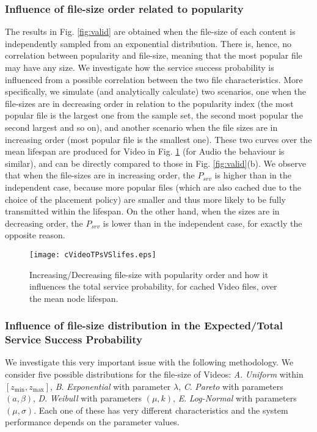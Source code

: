 \documentclass[conference]{IEEEtran}
\begin{document}
\subsubsection{Influence of file-size order related to popularity}
The results in Fig. \ref{fig:valid} are obtained when the file-size of each content is independently sampled from an exponential distribution. There is, hence, no correlation between popularity and file-size, meaning that the most popular file may have any size. We investigate how the service success probability is influenced from a possible correlation between the two file characteristics. More specifically, we simulate (and analytically calculate) two scenarios, one when the file-sizes are in decreasing order in relation to the popularity index (the most popular file is the largest one from the sample set, the second most popular the second largest and so on), and another scenario when the file sizes are in increasing order (most popular file is the smallest one). These two curves over the mean lifespan are produced for Video in Fig. \ref{fig:Corr} (for Audio the behaviour is similar), and can be directly compared to those in Fig. \ref{fig:valid}(b). We observe that when the file-sizes are in increasing order, the $P_{srv}$ is higher than in the independent case, because more popular files (which are also cached due to the choice of the placement policy) are smaller and thus more likely to be fully transmitted within the lifespan. On the other hand, when the sizes are in decreasing order, the $P_{srv}$ is lower than in the independent case, for exactly the opposite reason.
\begin{figure}[ht!]
\centering
\texttt{[image: cVideoTPsVSlifes.eps]}
\caption{Increasing/Decreasing file-size with popularity order and how it influences the total service probability, for cached Video files, over the mean node lifespan.}
\label{fig:Corr}
\end{figure}


\subsubsection{Influence of file-size distribution in the Expected/Total Service Success Probability}
We investigate this very important issue with the following methodology. We consider five possible distributions for the file-size of Videos: \textit{A}. \textit{Uniform} within $\left[z_{\min}, z_{\max}\right]$, \textit{B}. \textit{Exponential} with parameter $\lambda$, \textit{C}. \textit{Pareto} with parameters $(a,\beta)$, \textit{D}. \textit{Weibull} with parameters $(\mu,k)$, \textit{E}. \textit{Log-Normal} with parameters $(\mu,\sigma)$. Each one of these has very different characteristics and the system performance depends on the parameter values. 
\end{document}
